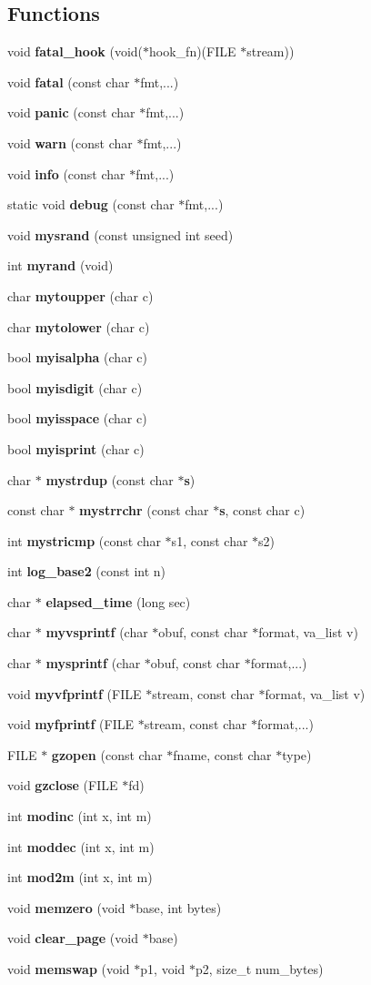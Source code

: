 \subsection*{Functions}
\begin{CompactItemize}
\item 
void {\bf fatal\_\-hook} (void($\ast$hook\_\-fn)(FILE $\ast$stream))
\item 
void {\bf fatal} (const char $\ast$fmt,...)
\item 
void {\bf panic} (const char $\ast$fmt,...)
\item 
void {\bf warn} (const char $\ast$fmt,...)
\item 
void {\bf info} (const char $\ast$fmt,...)
\item 
static void {\bf debug} (const char $\ast$fmt,...)
\item 
void {\bf mysrand} (const unsigned int seed)
\item 
int {\bf myrand} (void)
\item 
char {\bf mytoupper} (char c)
\item 
char {\bf mytolower} (char c)
\item 
bool {\bf myisalpha} (char c)
\item 
bool {\bf myisdigit} (char c)
\item 
bool {\bf myisspace} (char c)
\item 
bool {\bf myisprint} (char c)
\item 
char $\ast$ {\bf mystrdup} (const char $\ast${\bf s})
\item 
const char $\ast$ {\bf mystrrchr} (const char $\ast${\bf s}, const char c)
\item 
int {\bf mystricmp} (const char $\ast$s1, const char $\ast$s2)
\item 
int {\bf log\_\-base2} (const int n)
\item 
char $\ast$ {\bf elapsed\_\-time} (long sec)
\item 
char $\ast$ {\bf myvsprintf} (char $\ast$obuf, const char $\ast$format, va\_\-list v)
\item 
char $\ast$ {\bf mysprintf} (char $\ast$obuf, const char $\ast$format,...)
\item 
void {\bf myvfprintf} (FILE $\ast$stream, const char $\ast$format, va\_\-list v)
\item 
void {\bf myfprintf} (FILE $\ast$stream, const char $\ast$format,...)
\item 
FILE $\ast$ {\bf gzopen} (const char $\ast$fname, const char $\ast$type)
\item 
void {\bf gzclose} (FILE $\ast$fd)
\item 
int {\bf modinc} (int x, int m)
\item 
int {\bf moddec} (int x, int m)
\item 
int {\bf mod2m} (int x, int m)
\item 
void {\bf memzero} (void $\ast$base, int bytes)
\item 
void {\bf clear\_\-page} (void $\ast$base)
\item 
void {\bf memswap} (void $\ast$p1, void $\ast$p2, size\_\-t num\_\-bytes)
\end{CompactItemize}


